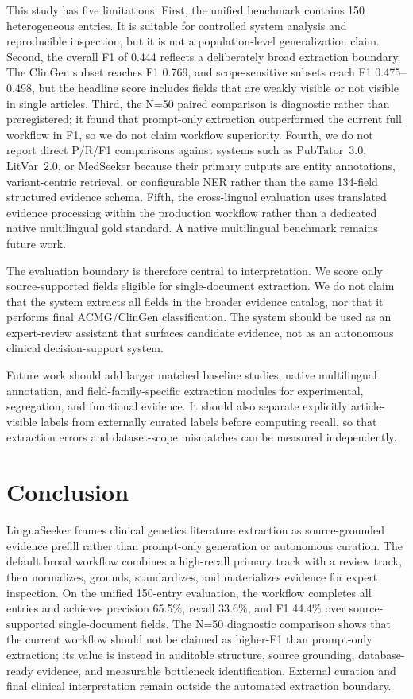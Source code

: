 \documentclass[conference]{IEEEtran}
\newcommand{\methodname}{LinguaSeeker}
\newcommand{\bmode}{broad}
\begin{document}
This study has five limitations. First, the unified benchmark contains 150 heterogeneous entries. It is suitable for controlled system analysis and reproducible inspection, but it is not a population-level generalization claim. Second, the overall F1 of 0.444 reflects a deliberately broad extraction boundary. The ClinGen subset reaches F1 0.769, and scope-sensitive subsets reach F1 0.475--0.498, but the headline score includes fields that are weakly visible or not visible in single articles. Third, the N=50 paired comparison is diagnostic rather than preregistered; it found that prompt-only extraction outperformed the current full workflow in F1, so we do not claim workflow superiority. Fourth, we do not report direct P/R/F1 comparisons against systems such as PubTator~3.0, LitVar~2.0, or MedSeeker because their primary outputs are entity annotations, variant-centric retrieval, or configurable NER rather than the same 134-field structured evidence schema. Fifth, the cross-lingual evaluation uses translated evidence processing within the production workflow rather than a dedicated native multilingual gold standard. A native multilingual benchmark remains future work.

The evaluation boundary is therefore central to interpretation. We score only source-supported fields eligible for single-document extraction. We do not claim that the system extracts all fields in the broader evidence catalog, nor that it performs final ACMG/ClinGen classification. The system should be used as an expert-review assistant that surfaces candidate evidence, not as an autonomous clinical decision-support system.

Future work should add larger matched baseline studies, native multilingual annotation, and field-family-specific extraction modules for experimental, segregation, and functional evidence. It should also separate explicitly article-visible labels from externally curated labels before computing recall, so that extraction errors and dataset-scope mismatches can be measured independently.

\section{Conclusion}
\methodname{} frames clinical genetics literature extraction as source-grounded evidence prefill rather than prompt-only generation or autonomous curation. The default \bmode{} workflow combines a high-recall primary track with a review track, then normalizes, grounds, standardizes, and materializes evidence for expert inspection. On the unified 150-entry evaluation, the workflow completes all entries and achieves precision 65.5\%, recall 33.6\%, and F1 44.4\% over source-supported single-document fields. The N=50 diagnostic comparison shows that the current workflow should not be claimed as higher-F1 than prompt-only extraction; its value is instead in auditable structure, source grounding, database-ready evidence, and measurable bottleneck identification. External curation and final clinical interpretation remain outside the automated extraction boundary.



\end{document}
